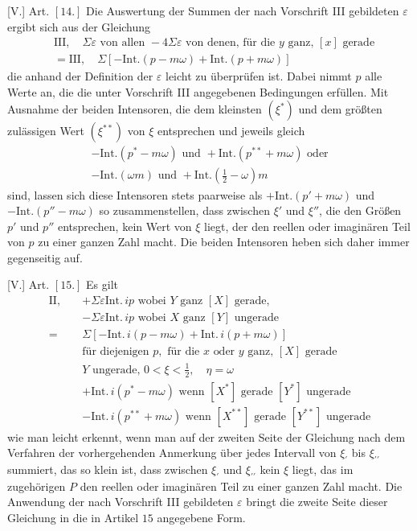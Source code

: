 [V.] Art. $[14.]$ Die Auswertung der Summen der nach Vorschrift III gebildeten $\varepsilon$ ergibt sich aus der Gleichung
\[
\begin{aligned}
&\mathrm{III},\quad\Sigma\varepsilon\text{ von allen }-4\Sigma\varepsilon\text{ von denen, für die }y\text{ ganz, }[x]\text{ gerade}\\
&=\mathrm{III},\quad\Sigma[-\mathrm{Int.}(p-m\omega)+\mathrm{Int.}(p+m\omega)]
\end{aligned}
\]
die anhand der Definition der $\varepsilon$ leicht zu überprüfen ist. Dabei nimmt $p$ alle Werte an, die die unter Vorschrift III angegebenen Bedingungen erfüllen. Mit Ausnahme der beiden Intensoren, die dem kleinsten $(\xi^{*})$ und dem größten zulässigen Wert $(\xi^{**})$ von $\xi$ entsprechen und jeweils gleich
\[
\begin{gathered}
-\mathrm{Int.}(p^{*}-m\omega)\text{ und }+\mathrm{Int.}(p^{**}+m\omega)\text{ oder}\\
-\mathrm{Int.}(\omega m)\text{ und }+\mathrm{Int.}(\tfrac12-\omega)m
\end{gathered}
\]
sind, lassen sich diese Intensoren stets paarweise als $+\mathrm{Int.}(p'+m\omega)$ und $-\mathrm{Int.}(p''-m\omega)$ so zusammenstellen, dass zwischen $\xi'$ und $\xi''$, die den Größen $p'$ und $p''$ entsprechen, kein Wert von $\xi$ liegt, der den reellen oder imaginären Teil von $p$ zu einer ganzen Zahl macht. Die beiden Intensoren heben sich daher immer gegenseitig auf.

[V.] Art. $[15.]$ Es gilt
\[
\begin{aligned}
\mathrm{II},\quad&+\Sigma\varepsilon\mathrm{Int.}\,ip\text{ wobei }Y\text{ ganz }[X]\text{ gerade},\\
&-\Sigma\varepsilon\mathrm{Int.}\,ip\text{ wobei }X\text{ ganz }[Y]\text{ ungerade}\\
={}&\Sigma[-\mathrm{Int.}\,i(p-m\omega)+\mathrm{Int.}\,i(p+m\omega)]\\
&\text{für diejenigen }p,\text{ für die }x\text{ oder }y\text{ ganz, }[X]\text{ gerade}\\
&Y\text{ ungerade, }0<\xi<\tfrac12,\quad\eta=\omega\\
&+\mathrm{Int.}\,i(p^{*}-m\omega)\text{ wenn }[X^{*}]\text{ gerade }[Y^{*}]\text{ ungerade}\\
&-\mathrm{Int.}\,i(p^{**}+m\omega)\text{ wenn }[X^{**}]\text{ gerade }[Y^{**}]\text{ ungerade}
\end{aligned}
\]
wie man leicht erkennt, wenn man auf der zweiten Seite der Gleichung nach dem Verfahren der vorhergehenden Anmerkung über jedes Intervall von $\xi_{\prime}$ bis $\xi_{\prime\prime}$ summiert, das so klein ist, dass zwischen $\xi_{\prime}$ und $\xi_{\prime\prime}$ kein $\xi$ liegt, das im zugehörigen $P$ den reellen oder imaginären Teil zu einer ganzen Zahl macht. Die Anwendung der nach Vorschrift III gebildeten $\varepsilon$ bringt die zweite Seite dieser Gleichung in die in Artikel $15$ angegebene Form.

